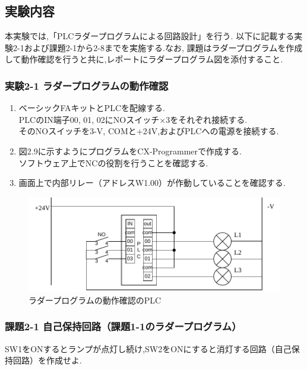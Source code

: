 \subsection{実験内容}

本実験では,「PLCラダープログラムによる回路設計」を行う.
以下に記載する実験2-1および課題2-1から2-8までを実施する.なお,
課題はラダープログラムを作成して動作確認を行うと共に,レポートにラダープログラム図を添付すること.

\subsubsection*{実験2-1 ラダープログラムの動作確認}
\begin{enumerate}
  \item ベーシックFAキットとPLCを配線する.\\
        PLCのIN端子00, 01, 02にNOスイッチ×3をそれぞれ接続する.\\
        そのNOスイッチを3-V, COMと+24V,およびPLCへの電源を接続する.
  \item 図2.9に示すようにプログラムをCX-Programmerで作成する.\\
        ソフトウェア上でNCの役割を行うことを確認する.
  \item 画面上で内部リレー（アドレスW1.00）が作動していることを確認する.
\end{enumerate}



\begin{figure}[H]
  \centering
  \includegraphics[scale=0.5]{sozai/5.pdf}
  \caption{ラダープログラムの動作確認のPLC}
\end{figure}

\subsubsection*{課題2-1 自己保持回路（課題1-1のラダープログラム）}
SW1をONするとランプが点灯し続け,SW2をONにすると消灯する回路（自己保持回路）を作成せよ.

